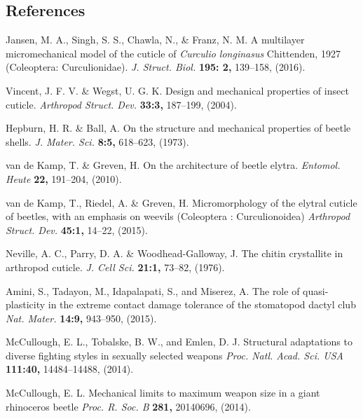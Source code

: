 \documentclass[twocolumn, linenumbers, superscriptaddress, nofootinbib]{revtex4-1}
\begin{document}
	\begin{thebibliography}{50}
		\section*{References}
				Jansen, M. A., Singh, S. S., Chawla, N., \& Franz, N. M.
				A multilayer micromechanical model of the cuticle of \textit{Curculio longinasus} Chittenden, 1927 (Coleoptera: Curculionidae).
				\textit{J. Struct. Biol.}
				\textbf{195: 2,}
				139--158,
				(2016).
					
				Vincent, J. F. V. \& Wegst, U. G. K.
				Design and mechanical properties of insect cuticle.				
				\textit{Arthropod Struct. Dev.}
				\textbf{33:3,}
				187--199,
				(2004).
				
				Hepburn, H. R. \& Ball, A.
				On the structure and mechanical properties of beetle shells.
				\textit{J. Mater. Sci.}
				\textbf{8:5,}
				618--623,
				(1973).
			
				van de Kamp, T. \& Greven, H.
				On the architecture of beetle elytra.
				\textit{Entomol. Heute}
				\textbf{22,}
				191--204,
				(2010).
			
				van de Kamp, T., Riedel, A. \& Greven, H.
				Micromorphology of the elytral cuticle of beetles, with an emphasis on weevils (Coleoptera : Curculionoidea)
				\textit{Arthropod Struct. Dev.}
				\textbf{45:1,}
				14--22,
				(2015).
			
				Neville, A. C., Parry, D. A. \& Woodhead-Galloway, J.
				The chitin crystallite in arthropod cuticle.
				\textit{J. Cell Sci.}
				\textbf{21:1,}
				73--82,
				(1976).
			
				Amini, S., Tadayon, M., Idapalapati, S., and Miserez, A.
				The role of quasi-plasticity in the extreme contact damage tolerance of the stomatopod dactyl club
				\textit{Nat. Mater.}
				\textbf{14:9,}
				943--950,
				(2015).
				
				McCullough, E. L., Tobalske, B. W., and Emlen, D. J.
				Structural adaptations to diverse fighting styles in sexually selected weapons
				\textit{Proc. Natl. Acad. Sci. USA}
				\textbf{111:40,}
				14484--14488,
				(2014).
				
				McCullough, E. L.
				Mechanical limits to maximum weapon size in a giant rhinoceros beetle
				\textit{Proc. R. Soc. B}
				\textbf{281,}
				20140696,
				(2014).
			

\end{thebibliography}
\end{document}

